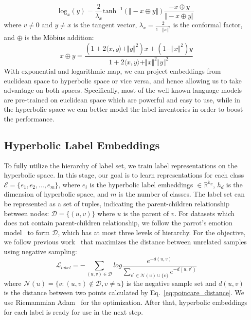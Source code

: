 \begin{equation}
    \textrm{log}_x(y) = \frac{2}{\lambda_x}\textrm{tanh}^{-1}(\Vert -x \oplus y \Vert)\frac{-x \oplus y}{\Vert -x \oplus y \Vert}
\end{equation}
where $v \neq 0$ and $y \neq x$ is the tangent vector, $\lambda_x = \frac{2}{1-\Vert x \Vert^2}$ is the conformal factor, and $\oplus$ is the Möbius addition:
\begin{equation}
    x \oplus y = \frac{(1+2\langle x,y \rangle + \Vert y \Vert^2)x + (1 - \Vert x \Vert^2)y}{1+2 \langle x,y \rangle + \Vert x \Vert^2 \Vert y \Vert^2}
\end{equation}
With exponential and logarithmic map, we can project embeddings from euclidean space to hyperbolic space or vice versa, and hence allowing us to take advantage on both spaces. Specifically, most of the well known language models are pre-trained on euclidean space which are powerful and easy to use, while in the hyperbolic space we can better model the label inventories in order to boost the performance.

\subsection{Hyperbolic Label Embeddings}
\label{sec:hyper_label_embedding}
To fully utilize the hierarchy of label set, we train label representations on the hyperbolic space. In this stage, our goal is to learn representations for each class $ \mathcal{E} = \{ e_1, e_2, \dots, e_m \}$, where $e_i$ is the hyperbolic label embeddings $ \in \mathbb{R}^{h_d}$, $h_d$ is the dimension of hyperbolic space, and $m$ is the number of classes. The label set can be represented as a set of tuples, indicating the parent-children relationship between nodes: $\mathcal{D} = \{(u,v)\}$ where $u$ is the parent of $v$. For datasets which does not contain parent-children relationship, we follow the parrot's emotion model~\cite{parrott2001emotions} to form $\mathcal{D}$, which has at most three levels of hierarchy. For the objective, we follow previous work~\cite{NIPS2017_poincare_hierarchical, ganea2018hyperbolic} that maximizes the distance between unrelated samples using negative sampling:
\begin{equation}
    \mathcal{L}_{label} = -\sum_{(u,v) \in \mathcal{D}} log \frac{e^{-d(u,v)}}{\sum_{v^{'} \in \mathcal{N}(u) \cup \{v\}}e^{-d(u,v^{'})}}
\end{equation}
where $\mathcal{N}(u) = \{v: (u,v) \not\in \mathcal{D}, v \neq u \}$ is the negative sample set and $d(u,v)$ is the distance between two points calculated by Eq.~\ref{eq:poincare_distance}. We use Riemammian Adam~\cite{becigneul2018riemannian_adam} for the optimization. After that, hyperbolic embeddings for each label is ready for use in the next step.

